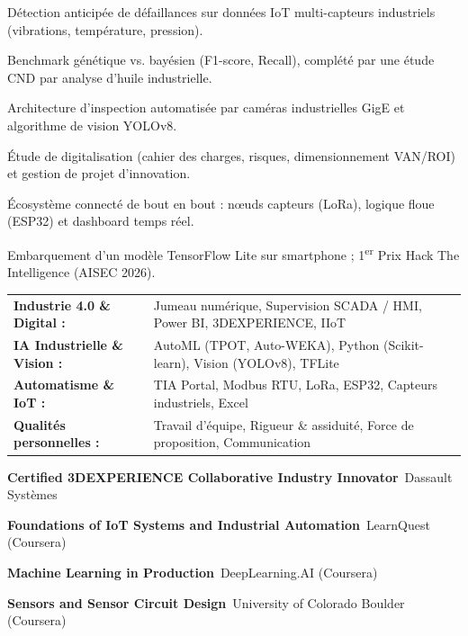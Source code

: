 \documentclass[10pt,a4paper]{../altacv}
\begin{document}
\begin{cvitems}
  \item Détection anticipée de défaillances sur données IoT multi-capteurs industriels (vibrations, température, pression).
  \item Benchmark génétique vs. bayésien (F1-score, Recall), complété par une étude CND par analyse d’huile industrielle.
\end{cvitems}
\vspace{2pt}
\begin{cvitems}
  \item Architecture d’inspection automatisée par caméras industrielles GigE et algorithme de vision YOLOv8.
  \item Étude de digitalisation (cahier des charges, risques, dimensionnement VAN/ROI) et gestion de projet d’innovation.
\end{cvitems}
\vspace{2pt}
\begin{cvitems}
  \item Écosystème connecté de bout en bout : nœuds capteurs (LoRa), logique floue (ESP32) et dashboard temps réel.
  \item Embarquement d’un modèle TensorFlow Lite sur smartphone ; 1\textsuperscript{er} Prix Hack The Intelligence (AISEC 2026).
\end{cvitems}

{\small
\begin{tabular}{@{}ll@{}}
\textbf{Industrie 4.0 \& Digital :} & Jumeau numérique, Supervision SCADA / HMI, Power BI, 3DEXPERIENCE, IIoT \\[1.5pt]
\textbf{IA Industrielle \& Vision :} & AutoML (TPOT, Auto-WEKA), Python (Scikit-learn), Vision (YOLOv8), TFLite \\[1.5pt]
\textbf{Automatisme \& IoT :} & TIA Portal, Modbus RTU, LoRa, ESP32, Capteurs industriels, Excel \\[1.5pt]
\textbf{Qualités personnelles :} & Travail d’équipe, Rigueur \& assiduité, Force de proposition, Communication
\end{tabular}
}

\begin{cvitems}
  \item \textbf{Certified 3DEXPERIENCE Collaborative Industry Innovator}~\hfill {\color{emphasis}Dassault Systèmes}
  \item \textbf{Foundations of IoT Systems and Industrial Automation}~\hfill {\color{emphasis}LearnQuest (Coursera)}
  \item \textbf{Machine Learning in Production}~\hfill {\color{emphasis}DeepLearning.AI (Coursera)}
  \item \textbf{Sensors and Sensor Circuit Design}~\hfill {\color{emphasis}University of Colorado Boulder (Coursera)}
\end{cvitems}

\cvactivites
\cvlangues
\end{document}
